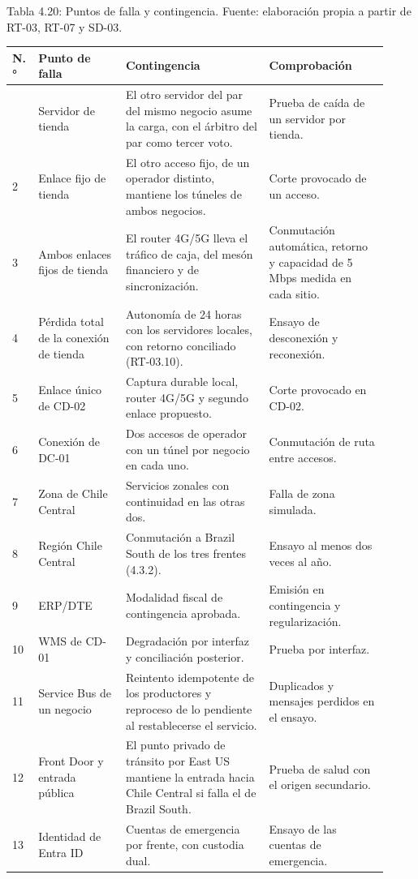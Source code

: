 \documentclass[11pt]{article}
\begin{document}
Tabla 4.20: Puntos de falla y contingencia. Fuente: elaboración propia a partir de RT-03, RT-07 y SD-03.\par\nopagebreak
\begin{longtable}{@{}p{0.04\linewidth}p{0.22\linewidth}p{0.36\linewidth}p{0.30\linewidth}@{}}
\toprule N.° & Punto de falla & Contingencia & Comprobación \\
\midrule\endhead\bottomrule\endlastfoot
1 & Servidor de tienda & El otro servidor del par del mismo negocio asume la carga, con el árbitro del par como tercer voto. & Prueba de caída de un servidor por tienda. \\
2 & Enlace fijo de tienda & El otro acceso fijo, de un operador distinto, mantiene los túneles de ambos negocios. & Corte provocado de un acceso. \\
3 & Ambos enlaces fijos de tienda & El router 4G/5G lleva el tráfico de caja, del mesón financiero y de sincronización. & Conmutación automática, retorno y capacidad de 5 Mbps medida en cada sitio. \\
4 & Pérdida total de la conexión de tienda & Autonomía de 24 horas con los servidores locales, con retorno conciliado (RT-03.10). & Ensayo de desconexión y reconexión. \\
5 & Enlace único de CD-02 & Captura durable local, router 4G/5G y segundo enlace propuesto. & Corte provocado en CD-02. \\
6 & Conexión de DC-01 & Dos accesos de operador con un túnel por negocio en cada uno. & Conmutación de ruta entre accesos. \\
7 & Zona de Chile Central & Servicios zonales con continuidad en las otras dos. & Falla de zona simulada. \\
8 & Región Chile Central & Conmutación a Brazil South de los tres frentes (4.3.2). & Ensayo al menos dos veces al año. \\
9 & ERP/DTE & Modalidad fiscal de contingencia aprobada. & Emisión en contingencia y regularización. \\
10 & WMS de CD-01 & Degradación por interfaz y conciliación posterior. & Prueba por interfaz. \\
11 & Service Bus de un negocio & Reintento idempotente de los productores y reproceso de lo pendiente al restablecerse el servicio. & Duplicados y mensajes perdidos en el ensayo. \\
12 & Front Door y entrada pública & El punto privado de tránsito por East US mantiene la entrada hacia Chile Central si falla el de Brazil South. & Prueba de salud con el origen secundario. \\
13 & Identidad de Entra ID & Cuentas de emergencia por frente, con custodia dual. & Ensayo de las cuentas de emergencia. \\
\end{longtable}
\end{document}
